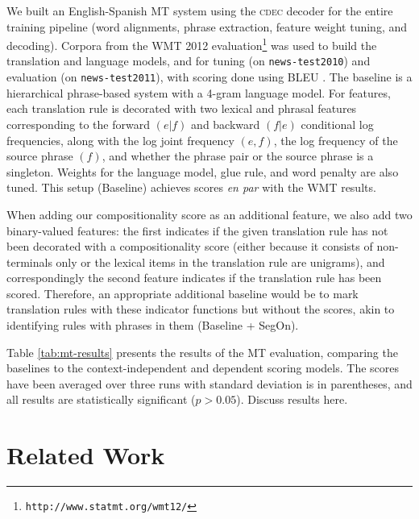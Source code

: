 \documentclass[11pt,letterpaper]{article}
\begin{document}
We built an English-Spanish MT system using the \textsc{cdec} decoder \cite{Dyer2010} for the entire training pipeline (word alignments, phrase extraction, feature weight tuning, and decoding).
Corpora from the WMT 2012 evaluation\footnote{\texttt{http://www.statmt.org/wmt12/}} was used to build the translation and language models, and for tuning (on \texttt{news-test2010}) and evaluation (on \texttt{news-test2011}), with scoring done using BLEU \cite{Papineni2002}. 
The baseline is a hierarchical phrase-based system \cite{Chiang2007} with a 4-gram language model. 
For features, each translation rule is decorated with two lexical and phrasal features corresponding to the forward $(e|f)$ and backward $(f|e)$ conditional log frequencies, along with the log joint frequency $(e,f)$, the log frequency of the source phrase $(f)$, and whether the phrase pair or the source phrase is a singleton. 
Weights for the language model, glue rule, and word penalty are also tuned. 
This setup (Baseline) achieves scores \emph{en par} with the WMT results. 

When adding our compositionality score as an additional feature, we also add two binary-valued features: the first indicates if the given translation rule has not been decorated with a compositionality score (either because it consists of non-terminals only or the lexical items in the translation rule are unigrams), and correspondingly the second feature indicates if the translation rule has been scored. 
Therefore, an appropriate additional baseline would be to mark translation rules with these indicator functions but without the scores, akin to identifying rules with phrases in them (Baseline + SegOn). 

Table \ref{tab:mt-results} presents the results of the MT evaluation, comparing the baselines to the context-independent and dependent scoring models. 
The scores have been averaged over three runs with standard deviation is in parentheses, and all results are statistically significant ($p > 0.05$). 
Discuss results here. 

\section{Related Work}
\end{document}
